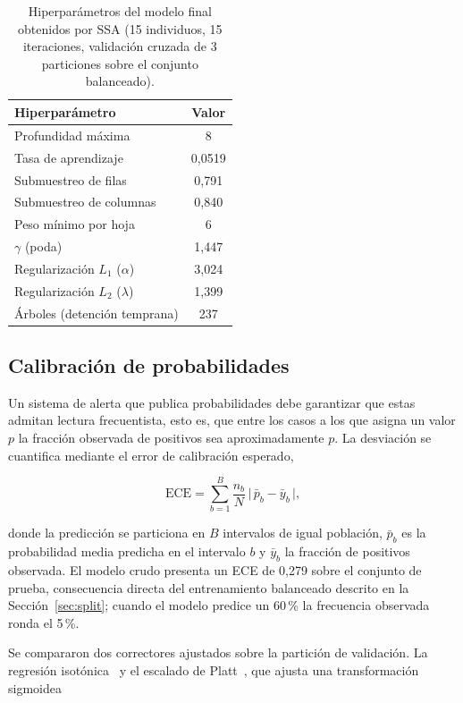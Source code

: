 \documentclass[11pt,a4paper]{article}
\begin{document}
\begin{table}[H]
\centering\small
\begin{tabular}{@{}lc@{}}
\toprule
\textbf{Hiperparámetro} & \textbf{Valor} \\
\midrule
Profundidad máxima & 8 \\
Tasa de aprendizaje & 0,0519 \\
Submuestreo de filas & 0,791 \\
Submuestreo de columnas & 0,840 \\
Peso mínimo por hoja & 6 \\
$\gamma$ (poda) & 1,447 \\
Regularización $L_1$ ($\alpha$) & 3,024 \\
Regularización $L_2$ ($\lambda$) & 1,399 \\
Árboles (detención temprana) & 237 \\
\bottomrule
\end{tabular}
\caption{Hiperparámetros del modelo final obtenidos por SSA (15 individuos,
15 iteraciones, validación cruzada de 3 particiones sobre el conjunto
balanceado).}
\label{tab:hiperparametros}
\end{table}

\subsection{Calibración de probabilidades}
\label{sec:calibracion}

Un sistema de alerta que publica probabilidades debe garantizar que estas
admitan lectura frecuentista, esto es, que entre los casos a los que asigna
un valor $p$ la fracción observada de positivos sea aproximadamente $p$. La
desviación se cuantifica mediante el error de calibración esperado,

\begin{equation}
\mathrm{ECE} = \sum_{b=1}^{B} \frac{n_b}{N}\,
\bigl|\, \bar{p}_b - \bar{y}_b \,\bigr|,
\label{eq:ece}
\end{equation}

\noindent donde la predicción se particiona en $B$ intervalos de igual
población, $\bar{p}_b$ es la probabilidad media predicha en el intervalo
$b$ y $\bar{y}_b$ la fracción de positivos observada. El modelo crudo
presenta un ECE de 0,279 sobre el conjunto de prueba, consecuencia directa
del entrenamiento balanceado descrito en la Sección~\ref{sec:split};
cuando el modelo predice un 60\,\% la frecuencia observada ronda el 5\,\%.

Se compararon dos correctores ajustados sobre la partición de validación.
La regresión isotónica~\cite{zadrozny2002} y el escalado de
Platt~\cite{platt1999}, que ajusta una transformación sigmoidea
\end{document}
